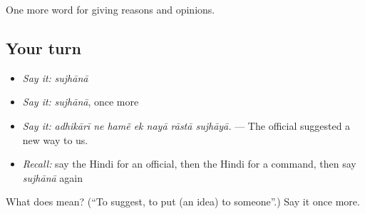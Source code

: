 \begin{grammarlens}[title={What you've built}]
One more word for giving reasons and opinions.
\end{grammarlens}

\subsection*{Your turn}
\begin{itemize}
\raggedright
  \item \emph{Say it:} \emph{sujhānā}
  \item \emph{Say it:} \emph{sujhānā}, once more
  \item \emph{Say it:} \emph{adhikārī ne hamẽ ek nayā rāstā sujhāyā.} — The official suggested a new way to us.
  \item \emph{Recall:} say the Hindi for an official, then the Hindi for a command, then say \emph{sujhānā} again
\end{itemize}

\begin{tcolorbox}[breakable,colback=teal!4,colframe=teal!35!black,title={Before you move on}]
What does  mean? (\textquotedblleft{}To suggest, to put (an idea) to someone\textquotedblright{}.) Say it once more.
\end{tcolorbox}
